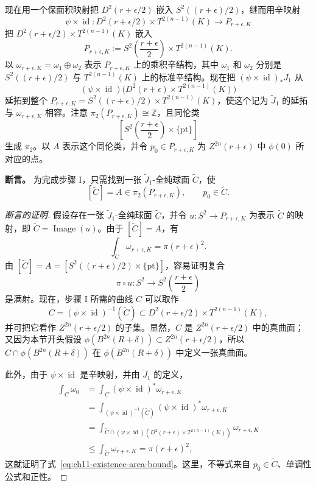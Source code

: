 现在用一个保面积映射把 $D^2(r+\epsilon/2)$ 嵌入
$S^2((r+\epsilon)/2)$，继而用辛映射
\[
 \psi\times\operatorname{id}:
 D^2(r+\epsilon/2)\times T^{2(n-1)}(K)
 \longrightarrow P_{r+\epsilon,K}
\]
把 $D^2(r+\epsilon/2)\times T^{2(n-1)}(K)$ 嵌入
\[
 P_{r+\epsilon,K}:=S^2\left(\frac{r+\epsilon}{2}\right)
 \times T^{2(n-1)}(K).
\]
以 $\omega_{r+\epsilon,K}=\omega_1\oplus\omega_2$ 表示 $P_{r+\epsilon,K}$ 上的乘积辛结构，其中 $\omega_1$ 和 $\omega_2$ 分别是
$S^2((r+\epsilon)/2)$ 与 $T^{2(n-1)}(K)$ 上的标准辛结构。现在把
$(\psi\times\operatorname{id})_*J_1$ 从
\[
 (\psi\times\operatorname{id})
 \bigl(D^2(r+\epsilon)\times T^{2(n-1)}(K)\bigr)
\]
延拓到整个
$P_{r+\epsilon,K}=S^2((r+\epsilon)/2)\times T^{2(n-1)}(K)$，使这个记为 $\widetilde J_1$ 的延拓与 $\omega_{r+\epsilon,K}$ 相容。注意
$\pi_2(P_{r+\epsilon,K})\cong\mathbb Z$，且同伦类
\[
 \left[S^2\left(\frac{r+\epsilon}{2}\right)\times\{\mathrm{pt}\}\right]
\]
生成 $\pi_2$。以 $A$ 表示这个同伦类，并令
$p_0\in P_{r+\epsilon,K}$ 为 $Z^{2n}(r+\epsilon)$ 中 $\phi(0)$ 所对应的点。

\medskip
\noindent\textbf{断言。}
为完成步骤 I，只需找到一张 $\widetilde J_1$-全纯球面 $\widetilde C$，使
\[
 [\widetilde C]=A\in\pi_2(P_{r+\epsilon,K}),
 \qquad p_0\in\widetilde C.
\]

\begin{proof}[断言的证明]
假设存在一张 $\widetilde J_1$-全纯球面 $\widetilde C$，并令
$u:S^2\to P_{r+\epsilon,K}$ 为表示 $\widetilde C$ 的映射，即
$\widetilde C=\operatorname{Image}(u)$。由于 $[\widetilde C]=A$，有
\[
 \int_{\widetilde C}\omega_{r+\epsilon,K}=\pi(r+\epsilon)^2.
\]
由
$[\widetilde C]=A=[S^2((r+\epsilon)/2)\times\{\mathrm{pt}\}]$，容易证明复合
\[
 \pi\circ u:S^2\longrightarrow S^2\left(\frac{r+\epsilon}{2}\right)
\]
是满射。现在，步骤 I 所需的曲线 $C$ 可以取作
\[
 C=(\psi\times\operatorname{id})^{-1}(\widetilde C)
 \subset D^2(r+\epsilon/2)\times T^{2(n-1)}(K),
\]
并可把它看作 $Z^{2n}(r+\epsilon/2)$ 的子集。显然，$C$ 是
$Z^{2n}(r+\epsilon/2)$ 中的真曲面；又因为本节开头假设
$\phi(B^{2n}(R+\delta))\subset Z^{2n}(r+\epsilon/2)$，所以
$C\cap\phi(B^{2n}(R+\delta))$ 在 $\phi(B^{2n}(R+\delta))$ 中定义一张真曲面。

此外，由于 $\psi\times\operatorname{id}$ 是辛映射，并由 $\widetilde J_1$ 的定义，
\[
 \begin{aligned}
 \int_C\omega_0
 &=\int_C(\psi\times\operatorname{id})^*\omega_{r+\epsilon,K}\\
 &=\int_{(\psi\times\operatorname{id})^{-1}(\widetilde C)}
     (\psi\times\operatorname{id})^*\omega_{r+\epsilon,K}\\
 &=\int_{\widetilde C\cap(\psi\times\operatorname{id})
   (D^2(r+\epsilon)\times T^{2(n-1)}(K))}\omega_{r+\epsilon,K}\\
 &\leq\int_{\widetilde C}\omega_{r+\epsilon,K}
 =\pi(r+\epsilon)^2,
 \end{aligned}
\]
这就证明了式~\eqref{eq:ch11-existence-area-bound}。这里，不等式来自
$p_0\in\widetilde C$、单调性公式和正性。
\end{proof}

